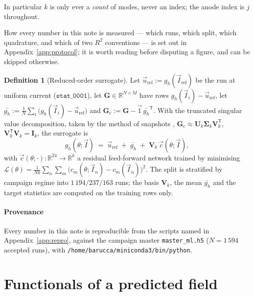 \documentclass[11pt,a4paper]{article}
\newcommand{\vect}[1]{\mathbf{#1}}
\newcommand{\Real}{\mathbb{R}}
\theoremstyle{plain}
\theoremstyle{definition}
\newtheorem{definition}[proposition]{Definition}
\theoremstyle{remark}
\begin{document}
\noindent
In particular $k$ is only ever a \emph{count} of modes, never an index; the
anode index is $j$ throughout.

How every number in this note is measured --- which runs, which split, which quadrature, and which of
two $R^2$ conventions --- is set out in Appendix~\ref{app:protocol}; it is worth
reading before disputing a figure, and can be skipped otherwise.

\begin{definition}[Reduced-order surrogate]
\label{def:pod}
Let $\vec{u}_{\mathrm{ref}} := g_h(\vec{I}_{\mathrm{ref}})$ be the run at uniform
current ($\texttt{stat\_0001}$), let $\vect{G} \in \Real^{N\times M}$ have rows
$g_h(\vec{I}_i) - \vec{u}_{\mathrm{ref}}$, let
$\bar{g_h} := \tfrac1N\sum_i \bigl(g_h(\vec{I}_i)-\vec{u}_{\mathrm{ref}}\bigr)$
and $\vect{G}_c := \vect{G} - \vec{1}\,\bar{g_h}^{\mathsf{T}}$. With the
truncated singular value decomposition, taken by the method of snapshots
\cite{sirovich,bhl},
$\vect{G}_c \approx \vect{U}_k\vect{\Sigma}_k\vect{V}_k^{\mathsf{T}}$,
$\vect{V}_k^{\mathsf{T}}\vect{V}_k = \vect{I}_k$, the surrogate is
\begin{equation}
\label{eq:surrogate}
g_h(\theta;\vec{I}) \;=\; \vec{u}_{\mathrm{ref}} \;+\; \bar{g_h}
\;+\; \vect{V}_k\,\vec{c}(\theta;\vec{I}),
\end{equation}
with $\vec{c}(\theta;\cdot):\Real^{24}\to\Real^{k}$ a residual feed-forward
network trained by minimising
$\mathcal{L}(\theta) = \tfrac{1}{Nk}\sum_{n}\sum_{m}
\bigl(c_m(\theta;\vec{I}_n)-c_m(\vec{I}_n)\bigr)^2$.
The split is stratified by campaign regime into $1\,194/237/163$ runs; the basis
$\vect{V}_k$, the mean $\bar{g_h}$ and the target statistics are computed on the
training rows only.
\end{definition}

\paragraph{Provenance}
Every number in this note is reproducible from the scripts named in
Appendix~\ref{app:repro}, against the campaign master
\texttt{master\_ml.h5} ($N=1\,594$ accepted runs), with
\texttt{/home/barucca/miniconda3/bin/python}.

\section{Functionals of a predicted field}
\label{sec:functionals}
\end{document}
